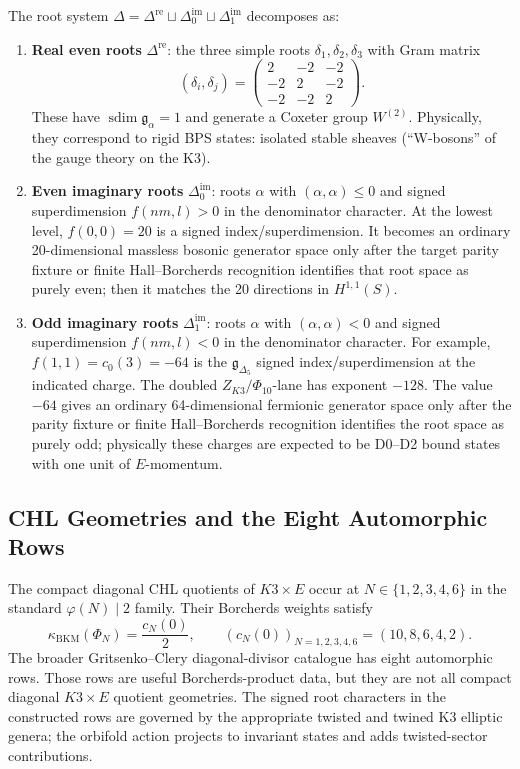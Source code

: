 \documentclass[11pt]{article}
\theoremstyle{definition}
\newcommand{\sdim}{\operatorname{sdim}}
\newcommand{\kBKM}{\kappa_{\mathrm{BKM}}}
\begin{document}
The root system $\Delta = \Delta^{\mathrm{re}} \sqcup
\Delta^{\mathrm{im}}_0 \sqcup \Delta^{\mathrm{im}}_1$ decomposes as:

\begin{enumerate}[label=(\roman*)]
 \item \textbf{Real even roots} $\Delta^{\mathrm{re}}$: the three
 simple roots $\delta_1, \delta_2, \delta_3$ with Gram matrix
 \[
 (\delta_i, \delta_j) = \begin{pmatrix}
 2 & -2 & -2 \\ -2 & 2 & -2 \\ -2 & -2 & 2
 \end{pmatrix}.
 \]
 These have \(\sdim\mathfrak g_\alpha=1\) and generate a Coxeter group $W^{(2)}$.
 Physically, they correspond to rigid BPS states: isolated stable
 sheaves (``W-bosons'' of the gauge theory on the K3).

 \item \textbf{Even imaginary roots} $\Delta^{\mathrm{im}}_0$:
 roots $\alpha$ with $(\alpha,\alpha) \leq 0$ and signed
 superdimension $f(nm,l) > 0$ in the denominator character. At the
 lowest level, $f(0,0)=20$ is a signed index/superdimension. It becomes
 an ordinary 20-dimensional massless bosonic generator space only after
 the target parity fixture or finite Hall--Borcherds recognition
 identifies that root space as purely even; then it matches the 20
 directions in $H^{1,1}(S)$.

 \item \textbf{Odd imaginary roots} $\Delta^{\mathrm{im}}_1$:
 roots $\alpha$ with $(\alpha,\alpha) < 0$ and signed
 superdimension $f(nm,l) < 0$ in the denominator character. For
 example, \(f(1,1)=c_0(3)=-64\) is the
 \(\mathfrak g_{\Delta_5}\) signed index/superdimension at the
 indicated charge. The doubled \(Z_{K3}/\Phi_{10}\)-lane has exponent
 \(-128\). The value \(-64\) gives an ordinary 64-dimensional
 fermionic generator space only after the parity fixture or finite
 Hall--Borcherds recognition identifies the root space as purely odd;
 physically these charges are expected to be D0--D2 bound states with
 one unit of $E$-momentum.
\end{enumerate}

\subsection{CHL Geometries and the Eight Automorphic Rows}

The compact diagonal CHL quotients of $K3\times E$ occur at
$N\in\{1,2,3,4,6\}$ in the standard $\varphi(N)\mid 2$ family. Their
Borcherds weights satisfy
\[
 \kBKM(\Phi_N)=\frac{c_N(0)}{2},
 \qquad
 (c_N(0))_{N=1,2,3,4,6}=(10,8,6,4,2).
\]
The broader Gritsenko--Clery diagonal-divisor catalogue has eight
automorphic rows. Those rows are useful Borcherds-product data, but
they are not all compact diagonal $K3\times E$ quotient geometries.
The signed root characters in the constructed rows are governed by the
appropriate twisted and twined K3 elliptic genera; the orbifold action
projects to invariant states and adds twisted-sector contributions.
\end{document}
